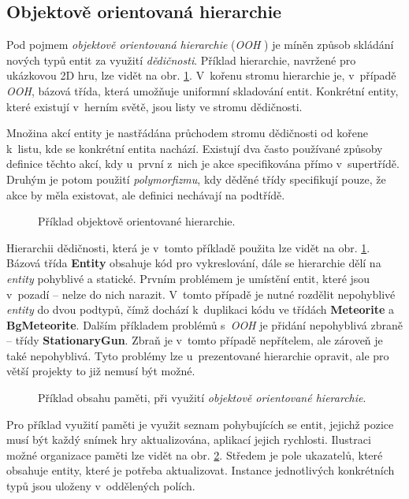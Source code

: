 \subsection{Objektově orientovaná hierarchie}

Pod pojmem \emph{objektově orientovaná hierarchie} (\emph{OOH} \cite{GameDesignPatterns}) je míněn způsob skládání nových typů entit za využití \emph{dědičnosti}. Příklad hierarchie, navržené pro ukázkovou 2D hru, lze vidět na obr. \ref{Fig:OOPHierarchy}. V~kořenu stromu hierarchie je, v~případě \emph{OOH}, bázová třída, která umožňuje uniformní skladování entit. Konkrétní entity, které existují v~herním světě, jsou listy ve stromu dědičnosti.

Množina akcí entity je nastřádána průchodem stromu dědičnosti od kořene k~listu, kde se konkrétní entita nachází. Existují dva často používané způsoby definice těchto akcí, kdy u~první z~nich je akce specifikována přímo v~supertřídě. Druhým je potom použití \emph{polymorfizmu}, kdy děděné třídy specifikují pouze, že akce by měla existovat, ale definici nechávají na podtřídě.

\begin{figure}[H]
	\centering
	\caption{Příklad objektově orientované hierarchie.}
	\label{Fig:OOPHierarchy}
\end{figure}

Hierarchii dědičnosti, která je v~tomto příkladě použita lze vidět na obr. \ref{Fig:OOPHierarchy}. Bázová třída \textbf{Entity} obsahuje kód pro vykreslování, dále se hierarchie dělí na \emph{entity} pohyblivé a statické. Prvním problémem je umístění entit, které jsou v~pozadí -- nelze do nich narazit. V~tomto případě je nutné rozdělit nepohyblivé \emph{entity} do dvou podtypů, čímž dochází k~duplikaci kódu ve třídách \textbf{Meteorite} a \textbf{BgMeteorite}. Dalším příkladem problémů s~\emph{OOH} je přidání nepohyblivá zbraně -- třídy \textbf{StationaryGun}. Zbraň je v~tomto případě nepřítelem, ale zároveň je také nepohyblivá. Tyto problémy lze u~prezentované hierarchie opravit, ale pro větší projekty to již nemusí být možné. 

\begin{figure}[H]
	\centering
	\caption{Příklad obsahu paměti, při využití \emph{objektově orientované hierarchie}.}
	\label{Fig:OOPMemory}
\end{figure}

Pro příklad využití paměti je využit seznam pohybujících se entit, jejichž pozice musí být každý snímek hry aktualizována, aplikací jejich rychlosti. Ilustraci možné organizace paměti lze vidět na obr. \ref{Fig:OOPMemory}. Středem je pole ukazatelů, které obsahuje entity, které je potřeba aktualizovat. Instance jednotlivých konkrétních typů jsou uloženy v~oddělených polích.

